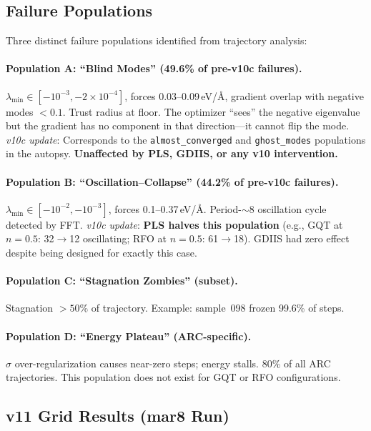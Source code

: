 \documentclass[11pt,a4paper]{article}
\theoremstyle{definition}
\begin{document}
\subsection{Failure Populations}

Three distinct failure populations identified from trajectory analysis:

\paragraph{Population A: ``Blind Modes'' (49.6\% of pre-v10c failures).}
$\lambda_\text{min} \in [-10^{-3}, -2\times10^{-4}]$, forces 0.03--0.09\,eV/\AA,
gradient overlap with negative modes $<0.1$.  Trust radius at floor.
The optimizer ``sees'' the negative eigenvalue but the gradient has no
component in that direction---it cannot flip the mode.
\emph{v10c update}: Corresponds to the \texttt{almost\_converged} and
\texttt{ghost\_modes} populations in the autopsy.
\textbf{Unaffected by PLS, GDIIS, or any v10 intervention.}

\paragraph{Population B: ``Oscillation--Collapse'' (44.2\% of pre-v10c failures).}
$\lambda_\text{min} \in [-10^{-2}, -10^{-3}]$, forces 0.1--0.37\,eV/\AA.
Period-$\sim$8 oscillation cycle detected by FFT.
\emph{v10c update}: \textbf{PLS halves this population} (e.g., GQT at
$n=0.5$: 32$\to$12 oscillating; RFO at $n=0.5$: 61$\to$18).
GDIIS had zero effect despite being designed for exactly this case.

\paragraph{Population C: ``Stagnation Zombies'' (subset).}
Stagnation $>50\%$ of trajectory.  Example: sample~098 frozen 99.6\% of steps.

\paragraph{Population D: ``Energy Plateau'' (ARC-specific).}
$\sigma$ over-regularization causes near-zero steps; energy stalls.
80\% of all ARC trajectories.  This population does not exist for
GQT or RFO configurations.

\subsection{v11 Grid Results (mar8 Run)}
\label{sec:v11}
\end{document}
